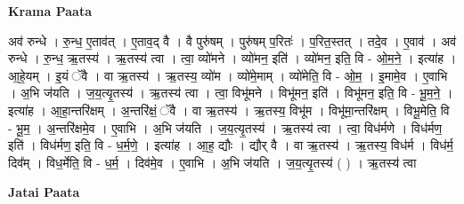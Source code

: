 \documentclass[17pt]{extarticle}
\begin{document}
\textbf{Krama Paata} \newline

अव॑ रुन्धे । रु॒न्ध॒ ए॒ताव॑त् । ए॒ताव॒द् वै । वै पुरु॑षम् । पुरु॑षम् प॒रितः॑ । प॒रित॒स्तत् । तदे॒व । ए॒वाव॑ । अव॑ रुन्धे । रु॒न्ध॒ ऋ॒तस्य॑ । ऋ॒तस्य॑ त्वा । त्वा॒ व्यो॑मने । व्यो॑मन॒ इति॑ । व्यो॑मन॒ इति॒ वि - ओ॒म॒ने॒ । इत्या॑ह । आ॒हे॒यम् । इ॒यं ॅवै । वा ऋ॒तस्य॑ । ऋ॒तस्य॒ व्यो॑म । व्यो॑मे॒माम् । व्यो॑मेति॒ वि - ओ॒म॒ । इ॒मामे॒व । ए॒वाभि । अ॒भि ज॑यति । ज॒य॒त्यृ॒तस्य॑ । ऋ॒तस्य॑ त्वा । त्वा॒ विभू॑मने । विभू॑मन॒ इति॑ । विभू॑मन॒ इति॒ वि - भू॒म॒ने॒ । इत्या॑ह । आ॒हा॒न्तरि॑क्षम् । अ॒न्तरि॑क्षं॒ ॅवै । वा ऋ॒तस्य॑ । ऋ॒तस्य॒ विभू॑म । विभू॑मा॒न्तरि॑क्षम् । विभू॒मेति॒ वि - भू॒म॒ । अ॒न्तरि॑क्षमे॒व । ए॒वाभि । अ॒भि ज॑यति । ज॒य॒त्यृ॒तस्य॑ । ऋ॒तस्य॑ त्वा । त्वा॒ विध॑र्मणे । विध॑र्मण॒ इति॑ । विध॑र्मण॒ इति॒ वि - ध॒र्म॒णे॒ । इत्या॑ह । आ॒ह॒ द्यौः । द्यौर् वै । वा ऋ॒तस्य॑ । ऋ॒तस्य॒ विध॑र्म । विध॑र्म॒ दिव᳚म् । विध॒र्मेति॒ वि - ध॒र्म॒ । दिव॑मे॒व । ए॒वाभि । अ॒भि ज॑यति । ज॒य॒त्यृ॒तस्य॑ ( ) । ऋ॒तस्य॑ त्वा \newline

\textbf{Jatai Paata} \newline
\end{document}
